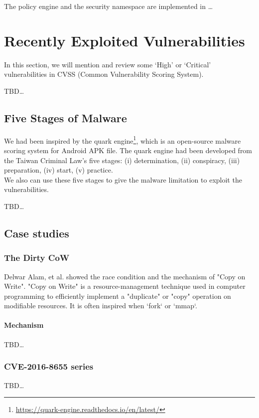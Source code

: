 The policy engine and the security namespace are implemented in \dots


\section{Recently Exploited Vulnerabilities}
In this section, we will mention and review some `High' or `Critical' vulnerabilities
in CVSS (Common Vulnerability Scoring System).

TBD\dots

\subsection{Five Stages of Malware}
We had been inspired by the quark engine\footnote{\url{https://quark-engine.readthedocs.io/en/latest/}},
which is an open-source malware scoring system for Android APK file. The quark
engine had been developed from the Taiwan Criminal Law's five stages:
(\Rn{1}) determination, (\Rn{2}) conspiracy, (\Rn{3}) preparation, (\Rn{4}) start, (\Rn{5}) practice.\\

We also can use these five stages to give the malware limitation to exploit the vulnerabilities.

TBD\dots

\subsection{Case studies}

\subsubsection{The Dirty CoW}
Delwar Alam, et al.\cite{8019988} showed the race condition and the mechanism of "Copy on
Write". "Copy on Write" is a resource-management technique used in computer programming
to efficiently implement a "duplicate" or "copy" operation on modifiable resources\cite{6394426}.
It is often inspired when ‘fork‘ or ‘mmap‘.

\paragraph{Mechanism}
TBD\dots

\subsubsection{CVE-2016-8655 series}
TBD\dots

